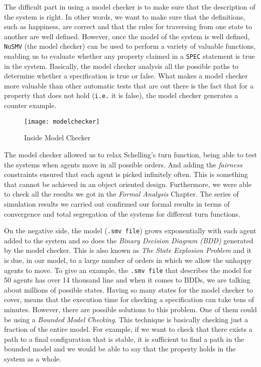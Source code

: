 \documentclass[../main.tex]{subfiles}
\begin{document}
The difficult part in using a model checker is to make sure that the description of the system is right. In other words, we want to make sure that the definitions, such as happiness, are correct and that the rules for traversing from one state to another are well defined. However, once the model of the system is well defined, \verb|NuSMV| (the model checker) can be used to perform a variety of valuable functions, enabling us to evaluate whether any property claimed in a \verb|SPEC| statement is true in the system. Basically, the model checker analysis all the possible paths to determine whether a specification is true or false. What makes a model checker more valuable than other automatic tests that are out there is the fact that for a property that does not hold (\verb|i.e.| it is false), the model checker generates a counter example. 


\begin{figure}[H]
\centering
\texttt{[image: modelchecker]}
\caption{Inside Model Checker \cite[]{modelchecker_picture}}
\end{figure}


The model checker allowed us to relax Schelling's turn function, being able to test the systems when agents move in all possible orders. And adding the \textit{fairness} constraints ensured that each agent is picked infinitely often. This is something that cannot be achieved in an object oriented design. Furthermore, we were able to check all the results we got in the \textit{Formal Analysis} Chapter. The series of simulation results we carried out confirmed our formal results in terms of convergence and total segregation of the systems for different turn functions. 

On the negative side, the model (\verb|.smv file|) grows exponentially with each agent added to the system and so does the \textit{Binary Decision Diagram (BDD)} generated by the model checker. This is also known as \textit{The State Explosion Problem} \cite[]{StateExplosionProblem} and it is due, in our model, to a large number of orders in which we allow the unhappy agents to move. To give an example, the \verb|.smv file| that describes the model for 50 agents has over 14 thousand line and when it comes to BDDs, we are talking about millions of possible states. Having so many states for the model checker to cover, means that the execution time for checking a specification can take tens of minutes. However, there are possible solutions to this problem. One of them could be using a \textit{Bounded Model Checking}. This technique is basically checking just a fraction of the entire model. For example, if we want to check that there exists a path to a final configuration that is stable, it is sufficient to find a path in the bounded model and we would be able to say that the property holds in the system as a whole.\\
\end{document}
